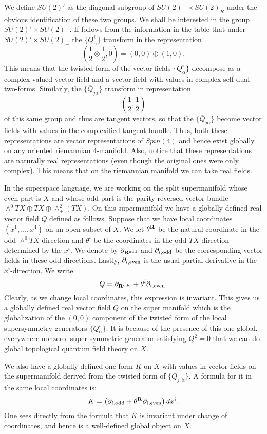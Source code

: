 \documentclass[10pt]{article}
\def\ov{\overline}
\begin{document}
We define $SU(2)'$ as the diagonal subgroup of
$SU(2)_+\times SU(2)_R$ under the obvious identification of these two groups. 
We shall be interested in the group $SU(2)'\times SU(2)_-$. 
If follows from the information in the table that under $SU(2)'\times
SU(2)_-$ the $\{Q^i_\alpha\}$ 
transform in the representation 
$$(\frac{1}{2}\otimes\frac{1}{2},0)=(0,0)\oplus (1,0).$$
This means that the twisted form of the vector fields $\{Q^i_\alpha\}$
decompose as a complex-valued vector field and a vector field with
values in complex self-dual two-forms.
Similarly, the $\{\overline{Q}_{j\dot\alpha}\}$ transform
in representation 
$$(\frac{1}{2},\frac{1}{2})$$ of this same group and thus are tangent
vectors, so that the  $\{\overline{Q}_{j\dot\alpha}\}$ become vector
fields with values in the complexified tangent bundle. 
Thus, both these representations are vector representations of
$Spin(4)$ and hence
exist globally on any oriented riemannian $4$-manifold.
Also, notice that these representations are naturally real
representations (even though the original ones were only complex).
This means that on the riemannian manifold we can take real fields.

In the superspace language, we are working on the split supermanifold
whose even part is $X$ and whose odd part is the parity reversed
vector bundle
$\wedge^0TX\oplus TX\oplus \wedge ^2_+(TX)$.
On this supermanifold we have a globally defined real vector field 
$Q$ defined as follows.
Suppose that we have  local coordinates $(x^1,\ldots,x^4)$ on an open
subset of $X$. We let $\theta^{\bf R}$ be the natural coordinate in the odd
$\wedge^0TX$-direction and $\theta^i$ be the coordinates in
the odd $TX$-direction determined by the $x^i$. We denote by
$\partial_{{\bf R}^{\rm odd}}$ 
and
$\partial_{i,{\rm odd}}$ be the corresponding vector fields in these
odd directions.  Lastly, $\partial_{i,{\rm even}}$ is the usual
partial derivative in the $x^i$-direction.
We write
$$Q=\partial_{{\bf R}^{\rm odd}}+\theta^i\partial_{i,{\rm even}}.$$
Clearly, as we change local coordinates, this expression is invariant.
This gives us a globally defined real vector field $Q$ on the super
manifold
which is the globalization of the $(0,0)$ component of the twisted
form of the local supersymmetry generators $\{Q_\alpha^i\}$.
It is because of the presence of this one
global, everywhere nonzero, super-symmetric generator satisfying
$Q^2=0$ that we can do global topological quantum field theory on $X$. 




We also have a globally defined one-form $K$ on $X$ with values in vector
fields on the supermanifold derived from the twisted form of
$\{\ov{Q}_{j,\dot\alpha}\}$.  
A formula for it in the same local coordinates is:
$$K=\left(\partial_{i,{\rm odd}}+\theta^{\bf R}\partial_{i,{\rm
even}}\right)dx^i.$$
One sees directly from the formula that $K$ is invariant under  change
of coordinates, and hence is a well-defined global object on $X$. 
\end{document}
